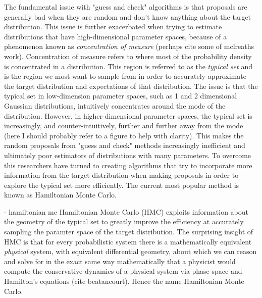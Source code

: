 The fundamental issue with "guess and check" algorithms is that proposals are generally bad when they are random and don't know anything about the target distribution. This issue is further exacerbated when trying to estimate distributions that have high-dimensional parameter spaces, because of a phenomenon known as \textit{concentration of measure} (perhaps cite some of mclreaths work). Concentration of measure refers to where most of the probability density is concentrated in a distribution. This region is referred to as the \textit{typical set} and is the region we most want to sample from in order to accurately approximate the target distribution and expectations of that distribution. The issue is that the typical set in low-dimension parameter spaces, such as 1 and 2 dimensional Gaussian distributions, intuitively concentrates around the mode of the distribution. However, in higher-dimensional parameter spaces, the typical set is increasingly, and counter-intuitively, further and further away from the mode (here I should probably refer to a figure to help with clarity). This makes the random proposals from "guess and check" methods increasingly inefficient and ultimately poor estimators of distributions with many parameters. To overcome this researchers have turned to creating algorithms that try to incorporate more information from the target distribution when making proposals in order to explore the typical set more efficiently. The current most popular method is known as Hamiltonian Monte Carlo.

- hamiltonian mc
Hamiltonian Monte Carlo (HMC) exploits information about the geometry of the typical set to greatly improve the efficiency at accurately sampling the paramter space of the target distribution. The surprising insight of HMC is that for every probabilistic system there is a mathematically equivalent \textit{physical} system, with equivalent differential geometry, about which we can reason and solve for in the exact same way mathematically that a physicist would compute the conservative dynamics of a physical system via phase space and Hamilton's equations (cite beatancourt). Hence the name Hamiltonian Monte Carlo.

